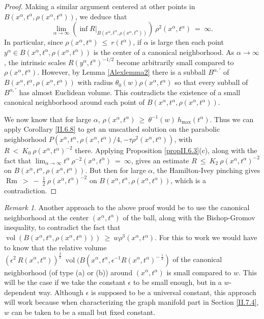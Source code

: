 \documentclass[12pt]{amsart}
\newcommand{\al}{\alpha}
\newcommand{\Rm}{\operatorname{Rm}}
\newcommand{\vol}{\operatorname{vol}}
\numberwithin{equation}{section}
\theoremstyle{plain}
\theoremstyle{definition}
\theoremstyle{remark}
\newtheorem{remark}[equation]{Remark}
\begin{document}
\begin{proof}
Making a similar argument centered at other points in
$B(x^\al, t^\al, \rho(x^\al, t^\al))$, we deduce that
\begin{equation}
\lim_{\al \rightarrow \infty} \left( \inf R \big|_{B(x^\al, t^\al, \rho(x^\al, t^\al))} \right) \: 
\rho^2(x^\al, t^\al) \: = \: \infty.
\end{equation}
In particular, since $\rho(x^\al, t^\al) \: \le \: r(t^\al)$, if $\al$ is
large then each point
$y^\al \in B(x^\al, t^\al, \rho(x^\al, t^\al))$ is the center of a canonical
neighborhood.
As $\al \rightarrow \infty$, the intrinsic scales
$R(y^{\al}, t^\al)^{-1/2}$ become arbitrarily small compared to $\rho(x^\al, t^\al)$.
However, by Lemma \ref{Alexlemma2} there is a subball $B^{\al, \prime}$ of
$B(x^\al,t^\al,\rho(x^\al,t^\al))$ with radius $\theta_0(w) \rho(x^\al,t^\al)$ so that every subball of
$B^{\al,\prime}$ has almost Euclidean volume. This contradicts the existence of a small
canonical neighborhood around each point of $B(x^\al,t^\al,\rho(x^\al,t^\al))$.


We now know that for large $\al$,
$\rho(x^\al, t^\al) \: \ge \: \theta^{-1}(w) \: h_{\max}(t^\al)$.
Thus we can apply Corollary \ref{II.6.8} to get an unscathed solution on the
parabolic neighborhood
$P(x^\al, t^\al, \rho(x^\al, t^\al)/4, - \tau \rho^2(x^\al, t^\al))$, with
$R \: < \: K_0 \: \rho(x^\al, t^\al)^{-2}$ there. Applying 
Proposition \ref{propII.6.3}(c),
along with the fact that
$\lim_{\al \rightarrow \infty} t^\al \: \rho^{-2}(x^\al, t^\al) \: = \:  
\infty$,
gives an estimate $R \: \le \: K_2 \: \rho(x^\al, t^\al)^{-2}$ on
$B(x^\al, t^\al, \rho(x^\al, t^\al))$.
But then for large $\al$, the Hamilton-Ivey
pinching gives $\Rm \: > \: - \: \frac12 \: \rho(x^\al, t^\al)^{-2}$ on 
$B(x^\al, t^\al, \rho(x^\al, t^\al))$, which is a contradiction.
\end{proof}

\begin{remark}
Another approach to the above proof  would be to use the
canonical neighborhood at the center $(x^\al, t^\al)$ of the ball,
along with the Bishop-Gromov
inequality, to contradict the fact that
$\vol(B(x^\al, t^\al, \rho(x^\al, t^\al))) \: \ge \: w \rho^3(x^\al, t^\al)$. For this
to work we would have to know that the relative volume
$(\epsilon^{2} \: R(x^\al, t^\al))^{\frac32} \:  \vol(B(x^\al, t^\al, \epsilon^{-1}
R(x^\al, t^\al)^{- \: \frac12})$ of the canonical neighborhood (of
type (a) or (b)) around $(x^\al, t^\al)$ is small compared to $w$. 
This will be the case if we take the constant $\epsilon$ to
be small enough, but in a $w$-dependent way.  Although $\epsilon$ is supposed
to be a universal constant, this approach will work because when 
characterizing the graph manifold part in Section \ref{II.7.4}, $w$ can be taken to be a 
small but fixed constant.
\end{remark}
\end{document}
